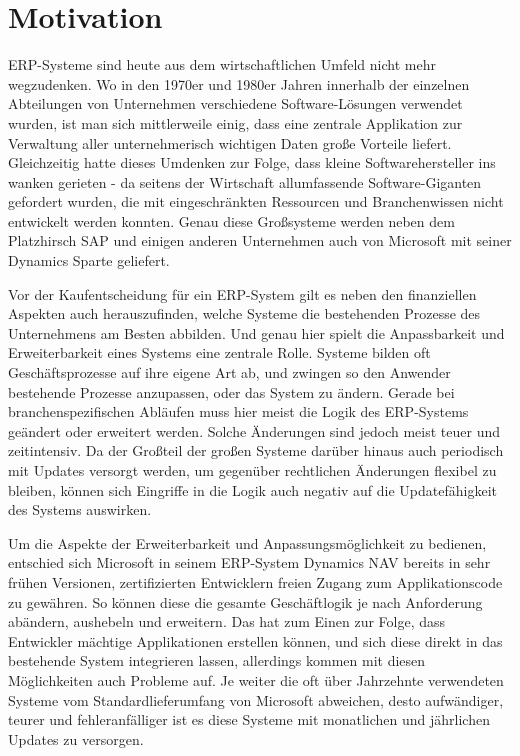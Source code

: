 \chapter{Motivation}
\label{cha:Motivation}

ERP-Systeme sind heute aus dem wirtschaftlichen Umfeld nicht mehr wegzudenken. Wo in den 1970er und 1980er Jahren innerhalb der einzelnen Abteilungen von Unternehmen verschiedene Software-Lösungen verwendet wurden, ist man sich mittlerweile einig, dass eine zentrale Applikation zur Verwaltung aller unternehmerisch wichtigen Daten große Vorteile liefert.
Gleichzeitig hatte dieses Umdenken zur Folge, dass kleine Softwarehersteller ins wanken gerieten - da seitens der Wirtschaft allumfassende Software-Giganten gefordert wurden, die mit eingeschränkten Ressourcen und Branchenwissen nicht entwickelt werden konnten. Genau diese Großsysteme werden neben dem Platzhirsch SAP und einigen anderen Unternehmen auch von Microsoft mit seiner Dynamics Sparte geliefert.

Vor der Kaufentscheidung für ein ERP-System gilt es neben den finanziellen Aspekten auch herauszufinden, welche Systeme die bestehenden Prozesse des Unternehmens am Besten abbilden. Und genau hier spielt die Anpassbarkeit und Erweiterbarkeit eines Systems eine zentrale Rolle. Systeme bilden oft Geschäftsprozesse auf ihre eigene Art ab, und zwingen so den Anwender bestehende Prozesse anzupassen, oder das System zu ändern. Gerade bei branchenspezifischen Abläufen muss hier meist die Logik des ERP-Systems geändert oder erweitert werden. Solche Änderungen sind jedoch meist teuer und zeitintensiv. Da der Großteil der großen Systeme darüber hinaus auch periodisch mit Updates versorgt werden, um gegenüber rechtlichen Änderungen flexibel zu bleiben, können sich Eingriffe in die Logik auch negativ auf die Updatefähigkeit des Systems auswirken. 

Um die Aspekte der Erweiterbarkeit und Anpassungsmöglichkeit zu bedienen, entschied sich Microsoft in seinem ERP-System Dynamics NAV bereits in sehr frühen Versionen, zertifizierten Entwicklern freien Zugang zum Applikationscode zu gewähren. So können diese die gesamte Geschäftlogik je nach Anforderung abändern, aushebeln und erweitern. Das hat zum Einen zur Folge, dass Entwickler mächtige Applikationen erstellen können, und sich diese direkt in das bestehende System integrieren lassen, allerdings kommen mit diesen Möglichkeiten auch Probleme auf. Je weiter die oft über Jahrzehnte verwendeten Systeme vom Standardlieferumfang von Microsoft abweichen, desto aufwändiger, teurer und fehleranfälliger ist es diese Systeme mit monatlichen und jährlichen Updates zu versorgen. 

